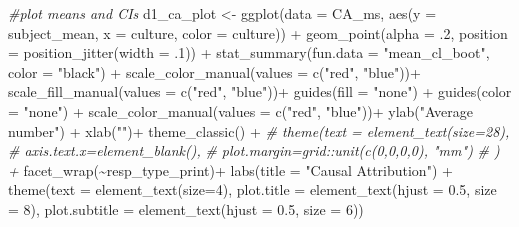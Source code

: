 \documentclass[
]{article}
\newenvironment{Shaded}{\begin{snugshade}}{\end{snugshade}}
\newcommand{\AttributeTok}[1]{\textcolor[rgb]{0.77,0.63,0.00}{#1}}
\newcommand{\CommentTok}[1]{\textcolor[rgb]{0.56,0.35,0.01}{\textit{#1}}}
\newcommand{\DecValTok}[1]{\textcolor[rgb]{0.00,0.00,0.81}{#1}}
\newcommand{\FloatTok}[1]{\textcolor[rgb]{0.00,0.00,0.81}{#1}}
\newcommand{\FunctionTok}[1]{\textcolor[rgb]{0.00,0.00,0.00}{#1}}
\newcommand{\NormalTok}[1]{#1}
\newcommand{\OtherTok}[1]{\textcolor[rgb]{0.56,0.35,0.01}{#1}}
\newcommand{\SpecialCharTok}[1]{\textcolor[rgb]{0.00,0.00,0.00}{#1}}
\newcommand{\StringTok}[1]{\textcolor[rgb]{0.31,0.60,0.02}{#1}}
\begin{document}
\begin{Shaded}
\begin{Highlighting}[]
\CommentTok{\#plot means and CIs}
\NormalTok{d1\_ca\_plot }\OtherTok{\textless{}{-}} \FunctionTok{ggplot}\NormalTok{(}\AttributeTok{data =}\NormalTok{ CA\_ms, }
       \FunctionTok{aes}\NormalTok{(}\AttributeTok{y =}\NormalTok{ subject\_mean, }\AttributeTok{x =}\NormalTok{ culture, }\AttributeTok{color =}\NormalTok{ culture)) }\SpecialCharTok{+}
\FunctionTok{geom\_point}\NormalTok{(}\AttributeTok{alpha =}\NormalTok{ .}\DecValTok{2}\NormalTok{, }\AttributeTok{position =} \FunctionTok{position\_jitter}\NormalTok{(}\AttributeTok{width =}\NormalTok{ .}\DecValTok{1}\NormalTok{)) }\SpecialCharTok{+} 
                    \FunctionTok{stat\_summary}\NormalTok{(}\AttributeTok{fun.data =} \StringTok{"mean\_cl\_boot"}\NormalTok{, }\AttributeTok{color =} \StringTok{"black"}\NormalTok{)  }\SpecialCharTok{+}
\FunctionTok{scale\_color\_manual}\NormalTok{(}\AttributeTok{values =} \FunctionTok{c}\NormalTok{(}\StringTok{"red"}\NormalTok{, }\StringTok{"blue"}\NormalTok{))}\SpecialCharTok{+}
\FunctionTok{scale\_fill\_manual}\NormalTok{(}\AttributeTok{values =} \FunctionTok{c}\NormalTok{(}\StringTok{"red"}\NormalTok{, }\StringTok{"blue"}\NormalTok{))}\SpecialCharTok{+}
\FunctionTok{guides}\NormalTok{(}\AttributeTok{fill =} \StringTok{"none"}\NormalTok{) }\SpecialCharTok{+}
\FunctionTok{guides}\NormalTok{(}\AttributeTok{color =} \StringTok{"none"}\NormalTok{) }\SpecialCharTok{+}
\FunctionTok{scale\_color\_manual}\NormalTok{(}\AttributeTok{values =} \FunctionTok{c}\NormalTok{(}\StringTok{"red"}\NormalTok{, }\StringTok{"blue"}\NormalTok{))}\SpecialCharTok{+}
\FunctionTok{ylab}\NormalTok{(}\StringTok{"Average number"}\NormalTok{) }\SpecialCharTok{+} 
\FunctionTok{xlab}\NormalTok{(}\StringTok{""}\NormalTok{)}\SpecialCharTok{+}
\FunctionTok{theme\_classic}\NormalTok{() }\SpecialCharTok{+}
\CommentTok{\#   theme(text = element\_text(size=28), }
\CommentTok{\#         axis.text.x=element\_blank(), }
\CommentTok{\#         plot.margin=grid::unit(c(0,0,0,0), "mm")}
\CommentTok{\#         )  + }
  \FunctionTok{facet\_wrap}\NormalTok{(}\SpecialCharTok{\textasciitilde{}}\NormalTok{resp\_type\_print)}\SpecialCharTok{+}
  \FunctionTok{labs}\NormalTok{(}\AttributeTok{title =} \StringTok{"Causal Attribution"}\NormalTok{) }\SpecialCharTok{+}
\FunctionTok{theme}\NormalTok{(}\AttributeTok{text =} \FunctionTok{element\_text}\NormalTok{(}\AttributeTok{size=}\DecValTok{4}\NormalTok{),}
      \AttributeTok{plot.title =} \FunctionTok{element\_text}\NormalTok{(}\AttributeTok{hjust =} \FloatTok{0.5}\NormalTok{, }\AttributeTok{size =} \DecValTok{8}\NormalTok{), }
      \AttributeTok{plot.subtitle =} \FunctionTok{element\_text}\NormalTok{(}\AttributeTok{hjust =} \FloatTok{0.5}\NormalTok{, }\AttributeTok{size =} \DecValTok{6}\NormalTok{))  }
\end{Highlighting}
\end{Shaded}
\end{document}
